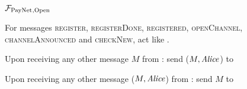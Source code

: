 \begin{figure}[H]
  \begin{systembox}{$\mathcal{F}_{\mathrm{PayNet}}{}_{\mathrm{, Open}}$}
    \begin{algorithmic}[1]
      \State For messages \textsc{register}, \textsc{registerDone},
      \textsc{registered}, \textsc{openChannel}, \textsc{channelAnnounced} and
      \textsc{checkNew}, act like \fpaynet{}.
      \Statex

      \State Upon receiving any other message $M$ from \alice:
      \Indent
          \State send ($M, \mathit{Alice}$) to \simulator
        \EndIf
      \EndIndent
      \Statex

      \State Upon receiving any other message ($M, \mathit{Alice}$) from \simulator:
      \Indent
          \State send $M$ to \alice
        \EndIf
      \EndIndent
    \end{algorithmic}
  \end{systembox}
  \caption{}
  \label{alg:proof:fpaynet:open}
\end{figure}

